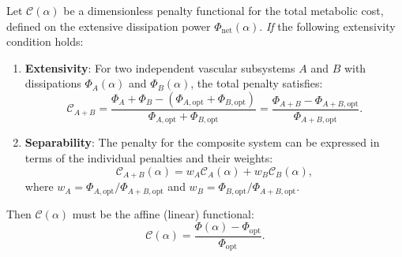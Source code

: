 \begin{theorem}
\label{thm:additivity}
Let $\mathcal{C}(\alpha)$ be a dimensionless penalty functional for the total
metabolic cost, defined on the extensive dissipation power
$\Phi_{\mathrm{net}}(\alpha)$. \emph{If} the following extensivity condition
holds:
\begin{enumerate}
    \item
\textbf{Extensivity}: For two independent vascular subsystems $A$ and $B$ with
dissipations $\Phi_A(\alpha)$ and $\Phi_B(\alpha)$, the total penalty satisfies:
    \begin{equation}
        \mathcal{C}_{A+B} =
        \frac{\Phi_A + \Phi_B - (\Phi_{A,\mathrm{opt}} + \Phi_{B,\mathrm{opt}})}
        {\Phi_{A,\mathrm{opt}} + \Phi_{B,\mathrm{opt}}}
        = \frac{\Phi_{A+B} - \Phi_{A+B,\mathrm{opt}}}{\Phi_{A+B,\mathrm{opt}}}.
    \end{equation}
    \item
\textbf{Separability}: The penalty for the composite system can be expressed in
terms of the individual penalties and their weights:
    \begin{equation}
        \mathcal{C}_{A+B}(\alpha) = w_A \mathcal{C}_A(\alpha) + w_B \mathcal{C}_B(\alpha),
    \end{equation}
where $w_A = \Phi_{A,\mathrm{opt}}/\Phi_{A+B,\mathrm{opt}}$ and $w_B =
\Phi_{B,\mathrm{opt}}/\Phi_{A+B,\mathrm{opt}}$.
\end{enumerate}
Then $\mathcal{C}(\alpha)$ must be the affine (linear) functional:
\begin{equation}
    \mathcal{C}(\alpha) = \frac{\Phi(\alpha) - \Phi_{\mathrm{opt}}}{\Phi_{\mathrm{opt}}}.
    \label{eq:additivity_unique}
\end{equation}
\end{theorem}


